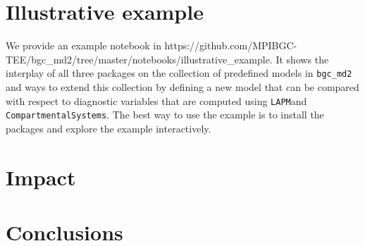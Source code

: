 \documentclass[a4paper]{article}
\newcommand{\LAPM}{\texttt{LAPM}}
\newcommand{\CompartmentalSystems}{\texttt{CompartmentalSystems}}
\begin{document}
\section{Illustrative example}
We provide an example notebook in
https://github.com/MPIBGC-TEE/bgc_md2/tree/master/notebooks/illustrative_example.
It shows the interplay of all three packages on the collection of predefined
models in \texttt{bgc\_md2} and ways to extend this collection by defining a new model
that can be compared with respect to diagnostic variables that are computed
using \LAPM and \CompartmentalSystems.  The best way to use the example is to
install the packages and explore the example interactively.

%

\section{Impact}


\section{Conclusions}




\end{document}
